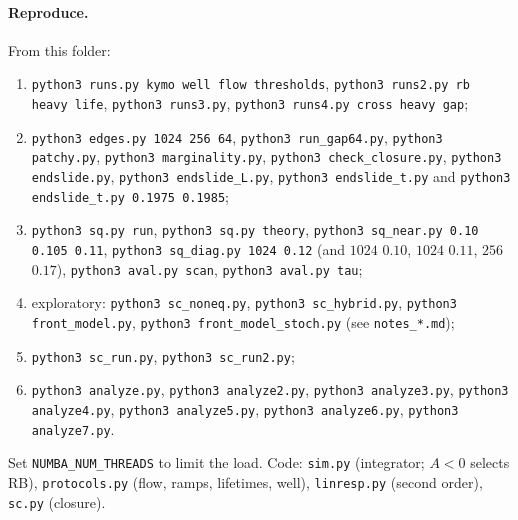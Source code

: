 \documentclass[10pt,a4paper]{article}
\begin{document}
\paragraph{Reproduce.}
From this folder:
\begin{enumerate}
\item \texttt{python3 runs.py kymo well flow thresholds}, \texttt{python3 runs2.py rb heavy life}, \texttt{python3 runs3.py}, \texttt{python3 runs4.py cross heavy gap};
\item \texttt{python3 edges.py 1024 256 64}, \texttt{python3 run\_gap64.py}, \texttt{python3 patchy.py}, \texttt{python3 marginality.py}, \texttt{python3 check\_closure.py}, \texttt{python3 endslide.py}, \texttt{python3 endslide\_L.py}, \texttt{python3 endslide\_t.py} and \texttt{python3 endslide\_t.py 0.1975 0.1985};
\item \texttt{python3 sq.py run}, \texttt{python3 sq.py theory}, \texttt{python3 sq\_near.py 0.10 0.105 0.11}, \texttt{python3 sq\_diag.py 1024 0.12} (and $1024$ $0.10$, $1024$ $0.11$, $256$ $0.17$), \texttt{python3 aval.py scan}, \texttt{python3 aval.py tau};
\item exploratory: \texttt{python3 sc\_noneq.py}, \texttt{python3 sc\_hybrid.py}, \texttt{python3 front\_model.py}, \texttt{python3 front\_model\_stoch.py} (see \texttt{notes\_*.md});
\item \texttt{python3 sc\_run.py}, \texttt{python3 sc\_run2.py};
\item \texttt{python3 analyze.py}, \texttt{python3 analyze2.py}, \texttt{python3 analyze3.py}, \texttt{python3 analyze4.py}, \texttt{python3 analyze5.py}, \texttt{python3 analyze6.py}, \texttt{python3 analyze7.py}.
\end{enumerate}
Set \texttt{NUMBA\_NUM\_THREADS} to limit the load. Code: \texttt{sim.py} (integrator; $A<0$ selects RB), \texttt{protocols.py} (flow, ramps, lifetimes, well), \texttt{linresp.py} (second order), \texttt{sc.py} (closure).
\end{document}
